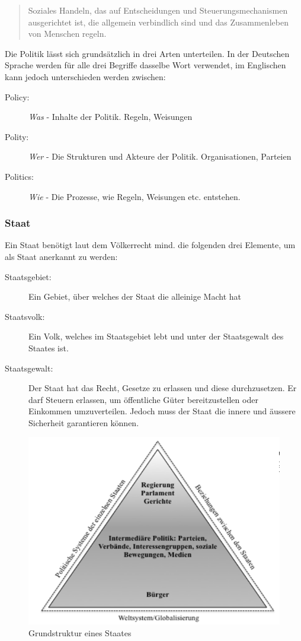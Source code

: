 \documentclass[a4paper, 11pt]{article}
\begin{document}
\begin{center}
    \blockquote{Soziales Handeln, das auf Entscheidungen und Steuerungsmechanismen ausgerichtet ist, die allgemein verbindlich sind und das Zusammenleben von Menschen regeln.}
\end{center}

Die Politik lässt sich grundsätzlich in drei Arten unterteilen. In der Deutschen Sprache werden für alle drei Begriffe dasselbe Wort verwendet, im Englischen kann jedoch unterschieden werden zwischen: 
\begin{description}
    \item[Policy: ] \textit{Was} - Inhalte der Politik. Regeln, Weisungen
    \item[Polity:] \textit{Wer} - Die Strukturen und Akteure der Politik.  Organisationen, Parteien 
    \item[Politics:]  \textit{Wie} - Die Prozesse, wie Regeln, Weisungen etc. entstehen.
\end{description}

\subsubsection{Staat}
Ein Staat benötigt laut dem Völkerrecht mind. die folgenden drei Elemente, um als Staat anerkannt zu werden: 
\begin{description}
    \item[Staatsgebiet: ] Ein Gebiet, über welches der Staat die alleinige Macht hat
    \item[Staatsvolk: ] Ein Volk, welches im Staatsgebiet lebt und unter der Staatsgewalt des Staates ist.
    \item[Staatsgewalt: ] Der Staat hat das Recht, Gesetze zu erlassen und diese durchzusetzen. Er darf Steuern erlassen, um öffentliche Güter bereitzustellen oder Einkommen umzuverteilen. Jedoch muss der Staat die innere und äussere Sicherheit garantieren können.
\end{description}

\begin{figure}[htb]
    \centering
    \includegraphics[keepaspectratio=true,height=15\baselineskip]{analytische_grundstruktur.png}
    \caption{Grundstruktur eines Staates}
    \label{fig:grundstrk_staat}
\end{figure}
\end{document}
